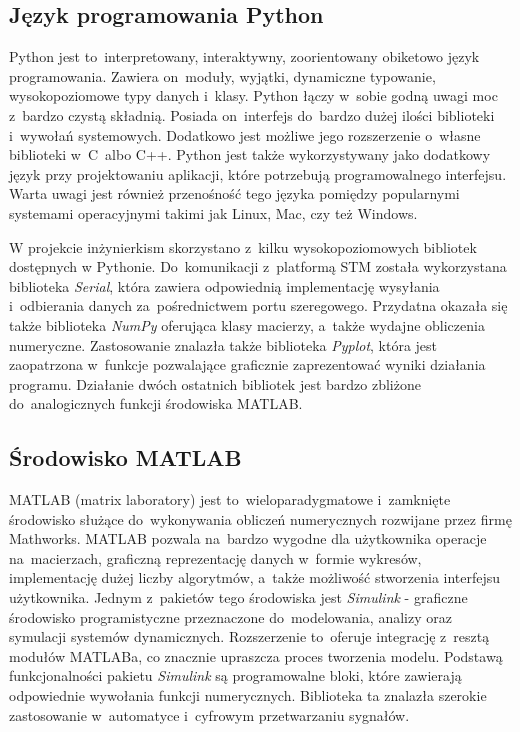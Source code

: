 \subsection{Język programowania Python} \label{sec:python}
Python jest to~interpretowany, interaktywny, zoorientowany obiketowo język programowania.
Zawiera on~moduły, wyjątki, dynamiczne typowanie, wysokopoziomowe typy danych i~klasy.
Python łączy w~sobie godną uwagi moc z~bardzo czystą składnią. Posiada on~interfejs do~bardzo
dużej ilości biblioteki i~wywołań systemowych. Dodatkowo jest możliwe jego rozszerzenie o~własne
biblioteki w~C~albo C++. Python jest także wykorzystywany jako dodatkowy język przy projektowaniu
aplikacji, które potrzebują programowalnego interfejsu. Warta uwagi jest również przenośność
tego języka pomiędzy popularnymi systemami operacyjnymi takimi jak Linux, Mac, czy też Windows.

W projekcie inżynierkism skorzystano z~kilku wysokopoziomowych bibliotek dostępnych
w Pythonie. Do~komunikacji z~platformą STM została wykorzystana biblioteka \textit{Serial}, która
zawiera odpowiednią implementację wysyłania i~odbierania danych za~pośrednictwem portu szeregowego.
Przydatna okazała się także biblioteka \textit{NumPy} oferująca klasy macierzy, a~także wydajne
obliczenia numeryczne. Zastosowanie znalazła także biblioteka \textit{Pyplot}, która jest
zaopatrzona w~funkcje pozwalające graficznie zaprezentować wyniki działania programu. Działanie
dwóch ostatnich bibliotek jest bardzo zbliżone do~analogicznych funkcji środowiska MATLAB.
\cite{python}

\subsection{Środowisko MATLAB} \label{sec:matlab}
MATLAB (matrix laboratory) jest to~wieloparadygmatowe i~zamknięte środowisko służące do~wykonywania 
obliczeń numerycznych rozwijane przez firmę Mathworks. MATLAB pozwala na~bardzo wygodne dla użytkownika
operacje na~macierzach, graficzną reprezentację danych w~formie wykresów, implementację dużej liczby
algorytmów, a~także możliwość stworzenia interfejsu użytkownika. Jednym z~pakietów tego środowiska 
jest \textit{Simulink} - graficzne środowisko programistyczne przeznaczone do~modelowania, analizy
oraz symulacji systemów dynamicznych. Rozszerzenie to~oferuje integrację z~resztą modułów MATLABa,
co znacznie upraszcza proces tworzenia modelu. Podstawą funkcjonalności pakietu \textit{Simulink}
są programowalne bloki, które zawierają odpowiednie wywołania funkcji numerycznych. Biblioteka ta
znalazła szerokie zastosowanie w~automatyce i~cyfrowym przetwarzaniu sygnałów. \cite{matlab}

